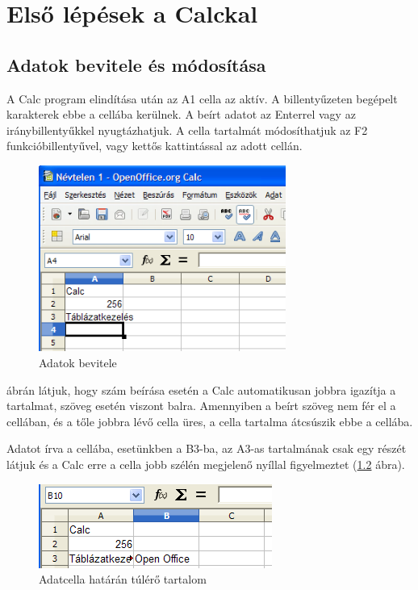\chapter{Első lépések a Calckal}
\thispagestyle{empty}

\section{Adatok bevitele és módosítása}

A Calc program elindítása után az A1 cella az aktív. A
billentyűzeten begépelt karakterek ebbe a cellába kerülnek. A
beírt adatot az Enterrel vagy az iránybillentyűkkel
nyugtázhatjuk. A cella tartalmát módosíthatjuk az F2
funkcióbillentyűvel, vagy kettős kattintással az adott
cellán. 

\begin{figure}[!h]
\begin{center}
\includegraphics[width=8.102cm]{oocalcv2-img5.png}
\caption{Adatok bevitele}\label{Adatbevitel}
\end{center}
\end{figure}

 ábrán látjuk, hogy szám beírása esetén a Calc
automatikusan jobbra igazítja a tartalmat,  szöveg esetén
viszont balra. Amennyiben a beírt szöveg nem fér el a cellában,
és a tőle jobbra lévő cella üres, a cella tartalma
átcsúszik ebbe a cellába.

Adatot írva a cellába, esetünkben a B3-ba, az A3-as tartalmának
csak egy részét látjuk és a Calc erre a cella jobb szélén
megjelenő nyíllal figyelmeztet (\ref{AdatcellaTúl} ábra).

\begin{figure}[!h]
\begin{center}
\includegraphics[width=7.645cm]{oocalcv2-img6.png}
\caption{Adatcella határán túlérő tartalom}\label{AdatcellaTúl}
\end{center}
\end{figure}

